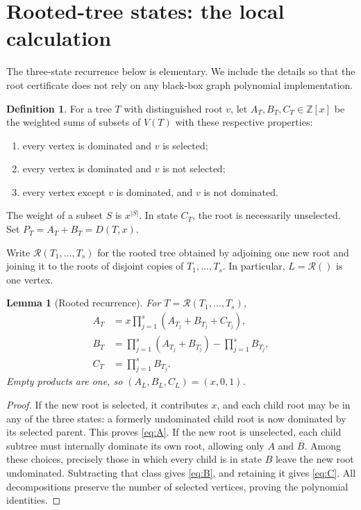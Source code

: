 \documentclass[11pt]{article}
\numberwithin{equation}{section}
\newtheorem{lemma}[theorem]{Lemma}
\theoremstyle{definition}
\newtheorem{definition}[theorem]{Definition}
\newcommand{\D}{D}
\newcommand{\Z}{\mathbb{Z}}
\newcommand{\Rtree}{\mathcal{R}}
\begin{document}
\section{Rooted-tree states: the local calculation}\label{sec:states}

The three-state recurrence below is elementary. We include the details
so that the root certificate does not rely on any black-box graph
polynomial implementation.

\begin{definition}
For a tree \(T\) with distinguished root \(v\), let \(A_T,B_T,C_T\in\Z[x]\)
be the weighted sums of subsets of \(V(T)\) with these respective
properties:
\begin{enumerate}[label=(\alph*),leftmargin=7mm,itemsep=1pt,topsep=2pt]
\item every vertex is dominated and \(v\) is selected;
\item every vertex is dominated and \(v\) is not selected;
\item every vertex except \(v\) is dominated, and \(v\) is not dominated.
\end{enumerate}
The weight of a subset \(S\) is \(x^{|S|}\). In state \(C_T\), the root
is necessarily unselected. Set \(P_T=A_T+B_T=\D(T,x)\).
\end{definition}

Write \(\Rtree(T_1,\ldots,T_s)\) for the rooted tree obtained by adjoining
one new root and joining it to the roots of disjoint copies of
\(T_1,\ldots,T_s\). In particular, \(L=\Rtree()\) is one vertex.

\begin{lemma}[Rooted recurrence]\label{lem:recurrence}
For \(T=\Rtree(T_1,\ldots,T_s)\),
\begin{align}
 A_T&=x\prod_{j=1}^s(A_{T_j}+B_{T_j}+C_{T_j}),\label{eq:A}\\
 B_T&=\prod_{j=1}^s(A_{T_j}+B_{T_j})-\prod_{j=1}^sB_{T_j},\label{eq:B}\\
 C_T&=\prod_{j=1}^sB_{T_j}.\label{eq:C}
\end{align}
Empty products are one, so \((A_L,B_L,C_L)=(x,0,1)\).
\end{lemma}
\begin{proof}
If the new root is selected, it contributes \(x\), and each child root
may be in any of the three states: a formerly undominated child root
is now dominated by its selected parent. This proves \eqref{eq:A}.
If the new root is unselected, each child subtree must internally
dominate its own root, allowing only \(A\) and \(B\). Among these
choices, precisely those in which every child is in state \(B\) leave
the new root undominated. Subtracting that class gives \eqref{eq:B},
and retaining it gives \eqref{eq:C}. All decompositions preserve the
number of selected vertices, proving the polynomial identities.
\end{proof}
\end{document}
